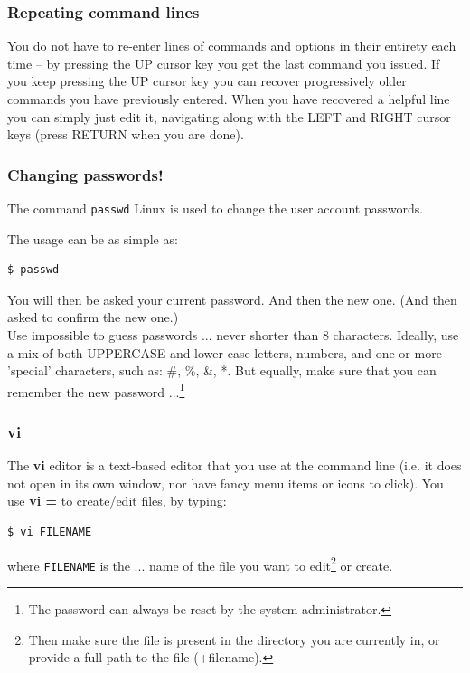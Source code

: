 \subsubsection*{Repeating command lines}

You do not have to re-enter lines of commands and options in their entirety each time – by pressing the UP cursor key you get the last command you issued. If you keep pressing the UP cursor key you can recover progressively older commands you have previously entered. When you have recovered a helpful line you can simply just edit it, navigating along with the LEFT and RIGHT cursor keys (press RETURN when you are done).

%
\subsubsection*{Changing passwords!}

The command \texttt{passwd} Linux is used to change the user account passwords.

The usage can be as simple as: 
\small\begin{verbatim}
$ passwd
\end{verbatim}\normalsize
You will then be asked your current password. And then the new one. (And then asked to confirm the new one.)
\\Use impossible to guess passwords ... never shorter than \(8\) characters. Ideally, use a mix of both UPPERCASE and lower case letters, numbers, and one or more 'special' characters, such as: \textsf{\footnotesize \#, \%, \&, *}. But equally, make sure that you can remember the new password ...\footnote{The password can always be reset by the system administrator.}

%
\subsubsection*{vi}

The \textbf{vi} editor is a text-based editor that you use at the command line (i.e. it does not open in its own window, nor have fancy menu items or icons to click). You use \textbf{vi =} to create/edit files, by typing:
\small\begin{verbatim}
$ vi FILENAME
\end{verbatim}\normalsize

\noindent where \texttt{FILENAME} is the ... name of the file you want to edit\footnote{Then make sure the file is present in the directory you are currently in, or provide a full path to the file (+filename).} or create.

